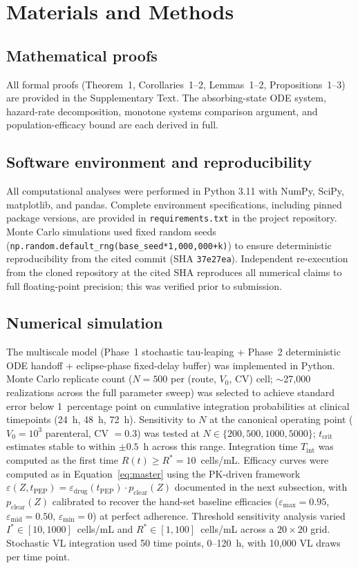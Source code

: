 \documentclass[10pt,letterpaper]{article}
\theoremstyle{definition}
\theoremstyle{remark}
\newcommand{\Tint}{T_{\text{int}}}
\newcommand{\tcrit}{t_{\text{crit}}}
\newcommand{\emax}{\varepsilon_{\max}}
\newcommand{\emid}{\varepsilon_{\text{mid}}}
\newcommand{\emin}{\varepsilon_{\min}}
\begin{document}
\section*{Materials and Methods}

\subsection*{Mathematical proofs}
All formal proofs (Theorem~1, Corollaries~1--2, Lemmas~1--2, Propositions~1--3) are provided in the Supplementary Text. The absorbing-state ODE system, hazard-rate decomposition, monotone systems comparison argument, and population-efficacy bound are each derived in full.

\subsection*{Software environment and reproducibility}
All computational analyses were performed in Python 3.11 with NumPy, SciPy, matplotlib, and pandas. Complete environment specifications, including pinned package versions, are provided in \texttt{requirements.txt} in the project repository. Monte Carlo simulations used fixed random seeds (\texttt{np.random.default\_rng(base\_seed*1{,}000{,}000+k)}) to ensure deterministic reproducibility from the cited commit (SHA \texttt{37e27ea}). Independent re-execution from the cloned repository at the cited SHA reproduces all numerical claims to full floating-point precision; this was verified prior to submission.

\subsection*{Numerical simulation}
The multiscale model (Phase~1 stochastic tau-leaping + Phase~2 deterministic ODE handoff + eclipse-phase fixed-delay buffer) was implemented in Python. Monte Carlo replicate count ($N = 500$ per (route, $V_{0}$, CV) cell; $\sim$27{,}000 realizations across the full parameter sweep) was selected to achieve standard error below 1~percentage point on cumulative integration probabilities at clinical timepoints (24~h, 48~h, 72~h). Sensitivity to $N$ at the canonical operating point ($V_{0} = 10^{3}$ parenteral, CV $= 0.3$) was tested at $N \in \{200, 500, 1000, 5000\}$; $\tcrit$ estimates stable to within $\pm 0.5$~h across this range. Integration time $\Tint$ was computed as the first time $R(t) \geq R^{*} = 10$~cells/mL. Efficacy curves were computed as in Equation~\ref{eq:master} using the PK-driven framework $\varepsilon(Z, t_{\text{PEP}}) = \varepsilon_{\text{drug}}(t_{\text{PEP}}) \cdot p_{\text{clear}}(Z)$ documented in the next subsection, with $p_{\text{clear}}(Z)$ calibrated to recover the hand-set baseline efficacies ($\emax = 0.95$, $\emid = 0.50$, $\emin = 0$) at perfect adherence. Threshold sensitivity analysis varied $I^{*} \in [10, 1000]$~cells/mL and $R^{*} \in [1, 100]$~cells/mL across a $20 \times 20$ grid. Stochastic VL integration used 50 time points, 0--120~h, with 10{,}000 VL draws per time point.
\end{document}
